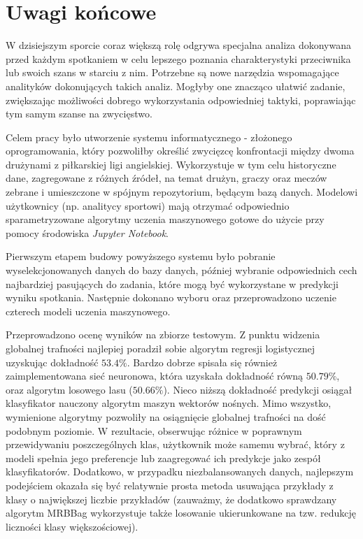 \chapter{Uwagi końcowe}

\noindent W dzisiejszym sporcie coraz większą rolę odgrywa specjalna analiza dokonywana przed każdym spotkaniem w celu lepszego poznania charakterystyki przeciwnika lub swoich szans w starciu z nim. Potrzebne są nowe narzędzia wspomagające analityków dokonujących takich analiz. Mogłyby one znacząco ułatwić zadanie, zwiększając możliwości dobrego wykorzystania odpowiedniej taktyki, poprawiając tym samym szanse na zwycięstwo. 

Celem pracy było utworzenie systemu informatycznego - złożonego oprogramowania, który pozwoliłby określić zwycięzcę konfrontacji między dwoma drużynami z piłkarskiej ligi angielskiej. Wykorzystuje w tym celu historyczne dane, zagregowane z różnych źródeł, na temat drużyn, graczy oraz meczów zebrane i umieszczone w spójnym repozytorium, będącym bazą danych. Modelowi użytkownicy (np. analitycy sportowi) mają otrzymać odpowiednio sparametryzowane algorytmy uczenia maszynowego gotowe do użycie przy pomocy środowiska \textit{Jupyter Notebook}.

Pierwszym etapem budowy powyższego systemu było pobranie wyselekcjonowanych danych do bazy danych, później wybranie odpowiednich cech najbardziej pasujących do zadania, które mogą być wykorzystane w predykcji wyniku spotkania. Następnie dokonano wyboru oraz przeprowadzono uczenie czterech modeli uczenia maszynowego. 

Przeprowadzono ocenę wyników na zbiorze testowym. Z punktu widzenia globalnej trafności najlepiej poradził sobie algorytm regresji logistycznej uzyskując dokładność $53.4\%$. Bardzo dobrze spisała się również zaimplementowana sieć neuronowa, która uzyskała dokładność równą $50.79\%$, oraz algorytm losowego lasu ($50.66\%$). Nieco niższą dokładność predykcji osiągał klasyfikator nauczony algorytm maszyn wektorów nośnych. Mimo wszystko, wymienione algorytmy pozwoliły na osiągnięcie globalnej trafności na dość podobnym poziomie.  W rezultacie,  obserwując różnice w poprawnym przewidywaniu poszczególnych klas, użytkownik może samemu wybrać, który z modeli spełnia jego preferencje lub zaagregować ich predykcje jako zespół klasyfikatorów. Dodatkowo, w przypadku niezbalansowanych danych, najlepszym podejściem okazała się być relatywnie prosta metoda usuwająca przykłady z klasy o największej liczbie przykładów (zauważmy, że dodatkowo sprawdzany algorytm MRBBag wykorzystuje także losowanie ukierunkowane na tzw. redukcję liczności klasy większościowej). 

